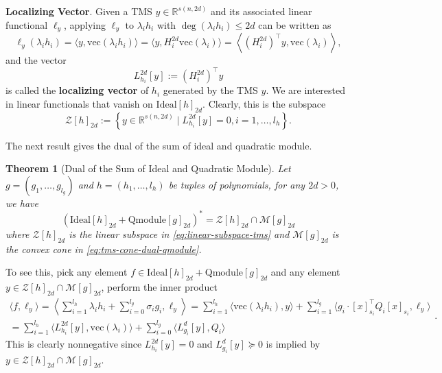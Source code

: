 \documentclass[
]{book}
\newtheorem{theorem}{Theorem}[chapter]
\theoremstyle{definition}
\theoremstyle{definition}
\theoremstyle{definition}
\theoremstyle{definition}
\theoremstyle{remark}
\begin{document}
\textbf{Localizing Vector}. Given a TMS \(y \in \mathbb{R}^{s(n,2d)}\) and its associated linear functional \(\ell_y\), applying \(\ell_y\) to \(\lambda_i h_i\) with \(\deg(\lambda_i h_i) \leq 2d\) can be written as
\[
\ell_y(\lambda_i h_i) = \langle y, \mathrm{vec}(\lambda_i h_i) \rangle = \langle y, H_i^{2d} \mathrm{vec}(\lambda_i) \rangle = \left\langle (H_i^{2d})^\top y, \mathrm{vec}(\lambda_i) \right\rangle,
\]
and the vector
\begin{equation}
L_{h_i}^{2d}[y] := (H_i^{2d})^\top y
\label{eq:localizing-vector}
\end{equation}
is called the \textbf{localizing vector} of \(h_i\) generated by the TMS \(y\). We are interested in linear functionals that vanish on \(\mathrm{Ideal}[h]_{2d}\). Clearly, this is the subspace
\begin{equation}
\mathcal{Z}[h]_{2d} :=  \left\{ y \in \mathbb{R}^{s(n,2d)} \mid L_{h_i}^{2d}[y] = 0,i=1,\dots,l_h  \right\} .
\label{eq:linear-subspace-tms}
\end{equation}

The next result gives the dual of the sum of ideal and quadratic module.

\begin{theorem}[Dual of the Sum of Ideal and Quadratic Module]
\protect\hypertarget{thm:DualSumIdealQuadraticModule}{}\label{thm:DualSumIdealQuadraticModule}Let \(g=(g_1,\dots,g_{l_g})\) and \(h=(h_1,\dots,l_h)\) be tuples of polynomials, for any \(2d > 0\), we have
\[
\left( \mathrm{Ideal}[h]_{2d} + \mathrm{Qmodule}[g]_{2d} \right)^* = \mathcal{Z}[h]_{2d} \cap \mathcal{M}[g]_{2d}
\]
where \(\mathcal{Z}[h]_{2d}\) is the linear subspace in \eqref{eq:linear-subspace-tms} and \(\mathcal{M}[g]_{2d}\) is the convex cone in \eqref{eq:tms-cone-dual-qmodule}.
\end{theorem}

To see this, pick any element \(f \in \mathrm{Ideal}[h]_{2d} + \mathrm{Qmodule}[g]_{2d}\) and any element \(y \in \mathcal{Z}[h]_{2d} \cap \mathcal{M}[g]_{2d}\), perform the inner product
\begin{equation}
\begin{split}
\langle f, \ell_y \rangle = \left\langle \sum_{i=1}^{l_h} \lambda_i h_i + \sum_{i=0}^{l_g} \sigma_i g_i , \ell_y \right\rangle = \sum_{i=1}^{l_h} \langle \mathrm{vec}(\lambda_i h_i), y \rangle + \sum_{i=1}^{l_g} \langle g_i \cdot [x]_{s_i}^\top Q_i [x]_{s_i}, \ell_y \rangle \\
= \sum_{i=1}^{l_h} \langle L_{h_i}^{2d}[y], \mathrm{vec}(\lambda_i) \rangle + \sum_{i=0}^{l_g} \langle L_{g_i}^d[y], Q_i \rangle
\end{split}.
\end{equation}
This is clearly nonnegative since \(L_{h_i}^{2d}[y] = 0\) and \(L_{g_i}^d[y] \succeq 0\) is implied by \(y \in \mathcal{Z}[h]_{2d} \cap \mathcal{M}[g]_{2d}\).
\end{document}
